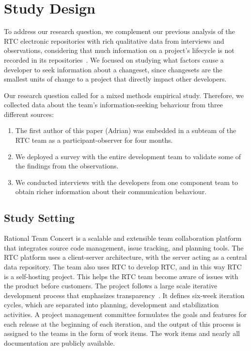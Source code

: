 \documentclass{sig-alternate}
\begin{document}
\section{Study Design}
\label{sec:studydesign}

To address our research question, we complement our previous analysis of the RTC electronic repositories with rich qualitative data from interviews and observations, considering that much information on a project's lifecycle is not recorded in its repositories~\cite{aranda:icse:2009}. We focused on studying what factors cause a developer to seek information about a changeset, since changesets are the smallest units of change to a project that directly impact other developers.

Our research question called for a mixed methods empirical study. Therefore, we collected data about the team's information-seeking behaviour from three different sources:

\begin{enumerate}
\item The first author of this paper (Adrian) was embedded in a subteam of the RTC team as a participant-observer for four months.
\item We deployed a survey with the entire development team to validate some of the findings from the observations.
\item We conducted interviews with the developers from one component team to obtain richer information about their communication behaviour.
\end{enumerate}

\vspace{4mm}
\subsection{Study Setting}
\label{sec:rtc}
 
Rational Team Concert is a scalable and extensible team collaboration platform that integrates source code management, issue tracking, and planning tools. The RTC platform uses a client-server architecture, with the server acting as a central data repository.
The team also uses RTC to develop RTC, and in this way RTC is a self-hosting project.
This helps the RTC team become aware of issues with the product before customers.%
The project follows a large scale iterative development process that emphasizes transparency~\cite{frost:ieeesoftware:2007}.
It defines six-week iteration cycles, which are  separated into planning, development and stabilization activities. A project management committee formulates the goals and features for each release at the beginning of each iteration, and the output of this process is assigned to the teams in the form of work items. The work items and nearly all documentation are publicly available.  %
\end{document}
